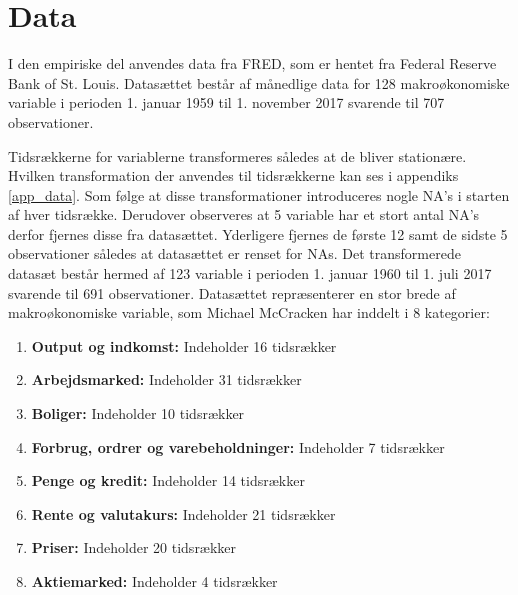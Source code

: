 \chapter{Data}
I den empiriske del anvendes data fra FRED, som er hentet fra Federal Reserve Bank of St. Louis.
Datasættet består af månedlige data for 128 makroøkonomiske variable i perioden 1. januar 1959 til 1. november 2017 svarende til 707 observationer.

Tidsrækkerne for variablerne transformeres således at de bliver stationære.
Hvilken transformation der anvendes til tidsrækkerne kan ses i appendiks \ref{app_data}. 
Som følge at disse transformationer introduceres nogle NA's i starten af hver tidsrække.
Derudover observeres at 5 variable har et stort antal NA's derfor fjernes disse fra datasættet.
Yderligere fjernes de første 12 samt de sidste 5 observationer således at datasættet er renset for NAs.
Det transformerede datasæt består hermed af 123 variable i perioden 1. januar 1960 til 1. juli 2017 svarende til 691 observationer.
%
Datasættet repræsenterer en stor brede af makroøkonomiske variable, som Michael McCracken har inddelt i 8 kategorier: 
\begin{enumerate}
\item \textbf{Output og indkomst:} Indeholder 16 tidsrækker
\item \textbf{Arbejdsmarked:}  Indeholder 31 tidsrækker
\item \textbf{Boliger:} Indeholder 10 tidsrækker
\item \textbf{Forbrug, ordrer og varebeholdninger:} Indeholder 7 tidsrækker
\item \textbf{Penge og kredit:} Indeholder 14 tidsrækker
\item\textbf{ Rente og valutakurs:} Indeholder 21 tidsrækker
\item \textbf{Priser:} Indeholder 20 tidsrækker
\item \textbf{Aktiemarked:} Indeholder 4 tidsrækker
\end{enumerate}
